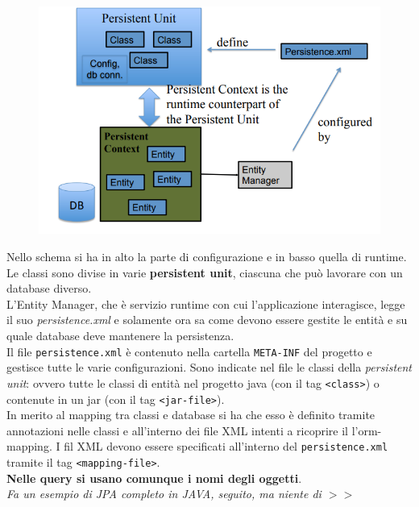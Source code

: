 \begin{figure}[H]
    \centering
    \includegraphics[scale = 0.57]{Imm/entity-manager.PNG}
\end{figure}
Nello schema si ha in alto la parte di configurazione e in basso quella di runtime. Le classi sono divise in varie \textbf{persistent unit}, ciascuna che può lavorare con un database diverso. \\ 
L'Entity Manager, che è servizio runtime con cui l'applicazione interagisce, legge il suo \textit{persistence.xml} e solamente ora sa come devono essere gestite le entità e su quale database deve mantenere la persistenza.\\

Il file \texttt{persistence.xml} è contenuto nella cartella \texttt{META-INF} del progetto e gestisce tutte le varie configurazioni. Sono indicate nel file le classi della \textit{persistent unit}: ovvero tutte le classi di entità nel progetto java (con il tag \texttt{<class>}) o contenute in un jar (con il tag \texttt{<jar-file>}).\\

In merito al mapping tra classi e database si ha che esso è definito tramite annotazioni nelle classi e all'interno dei file XML intenti a ricoprire il l'orm-mapping. I fil XML devono essere specificati all'interno del \texttt{persistence.xml} tramite il tag \texttt{<mapping-file>}.\\ 
\textbf{Nelle query si usano comunque i nomi degli oggetti}.\\
\textit{Fa un esempio di JPA completo in JAVA, seguito, ma niente di $>>$}


